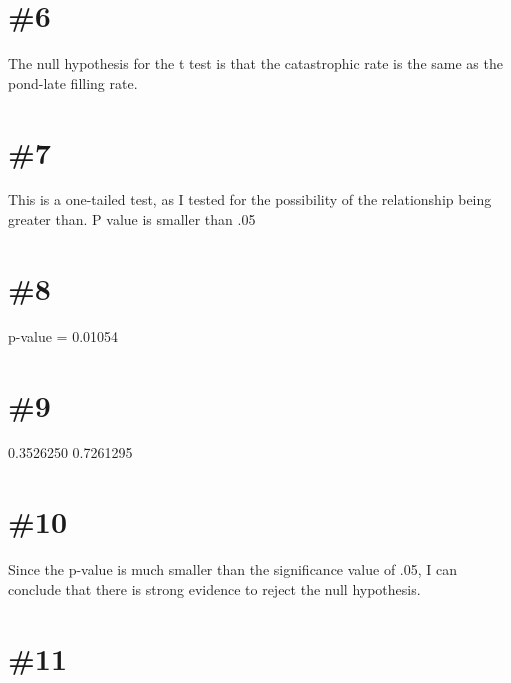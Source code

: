 \documentclass[
]{article}
\newenvironment{Shaded}{\begin{snugshade}}{\end{snugshade}}
\newcommand{\AttributeTok}[1]{\textcolor[rgb]{0.77,0.63,0.00}{#1}}
\newcommand{\DecValTok}[1]{\textcolor[rgb]{0.00,0.00,0.81}{#1}}
\newcommand{\FunctionTok}[1]{\textcolor[rgb]{0.00,0.00,0.00}{#1}}
\newcommand{\NormalTok}[1]{#1}
\newcommand{\SpecialCharTok}[1]{\textcolor[rgb]{0.00,0.00,0.00}{#1}}
\begin{document}
\hypertarget{section-5}{%
\section{\#6}\label{section-5}}

The null hypothesis for the t test is that the catastrophic rate is the
same as the pond-late filling rate.

\hypertarget{section-6}{%
\section{\#7}\label{section-6}}

This is a one-tailed test, as I tested for the possibility of the
relationship being greater than. P value is smaller than .05

\hypertarget{section-7}{%
\section{\#8}\label{section-7}}

p-value = 0.01054

\hypertarget{section-8}{%
\section{\#9}\label{section-8}}

0.3526250 0.7261295

\hypertarget{section-9}{%
\section{\#10}\label{section-9}}

Since the p-value is much smaller than the significance value of .05, I
can conclude that there is strong evidence to reject the null
hypothesis.

\hypertarget{section-10}{%
\section{\#11}\label{section-10}}

\begin{Shaded}
\end{Shaded}
\end{document}
